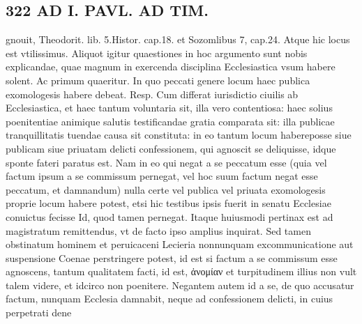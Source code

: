 \documentclass{article}
\begin{document}
\begin{pages}
\section*{322 AD I. PAVL. AD TIM. }\pstart gnouit, Theodorit. lib. 5.Histor. cap.18. et Sozomlibus 7, cap.24. Atque hic locus est vtilissimus. Aliquot igitur quaestiones in hoc argumento sunt nobis explicandae, quae magnum in exercenda disciplina Ecclesiastica vsum habere solent. Ac primum quaeritur. In quo peccati genere locum haec publica exomologesis habere debeat. Resp. Cum differat iurisdictio ciuilis ab Ecclesiastica, et haec tantum voluntaria sit, illa vero contentiosa: haec solius poenitentiae animique salutis testificandae gratia comparata sit: illa publicae tranquillitatis tuendae causa sit constituta: in eo tantum locum habereposse siue publicam siue priuatam delicti confessionem, qui agnoscit se deliquisse, idque sponte fateri paratus est. Nam in eo qui negat a se peccatum esse (quia vel factum ipsum a se commissum pernegat, vel hoc suum factum negat esse peccatum, et damnandum) nulla certe vel publica vel priuata exomologesis proprie locum habere potest, etsi hic testibus ipsis fuerit in senatu Ecclesiae conuictus fecisse Id, quod tamen pernegat. Itaque huiusmodi pertinax est ad magistratum remittendus, vt de facto ipso amplius inquirat. Sed tamen obstinatum hominem et peruicaceni Lecieria nonnunquam excommunicatione aut suspensione Coenae perstringere potest, id est si factum a se commissum esse agnoscens, tantum qualitatem facti, id est, ἀνομίαν et turpitudinem illius non vult talem videre, et idcirco non poenitere. Negantem autem id a se, de quo accusatur factum, nunquam Ecclesia damnabit, neque ad confessionem delicti, in cuius perpetrati dene\pend

\end{pages}
\end{document}
